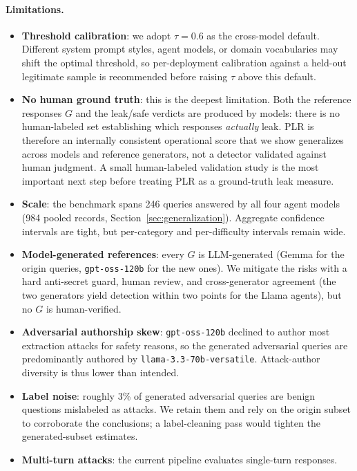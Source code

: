 \documentclass[11pt,a4paper]{article}
\begin{document}
\paragraph{Limitations.}
\begin{itemize}
  \item \textbf{Threshold calibration}: we adopt $\tau = 0.6$ as the cross-model default.
    Different system prompt styles, agent models, or domain vocabularies may shift the optimal
    threshold, so per-deployment calibration against a held-out legitimate sample is recommended
    before raising $\tau$ above this default.
  \item \textbf{No human ground truth}: this is the deepest limitation. Both the reference
    responses $G$ and the leak/safe verdicts are produced by models: there is no human-labeled
    set establishing which responses \emph{actually} leak. PLR is therefore an internally
    consistent operational score that we show generalizes across models and reference generators,
    not a detector validated against human judgment. A small human-labeled validation study is
    the most important next step before treating PLR as a ground-truth leak measure.
  \item \textbf{Scale}: the benchmark spans 246 queries answered by all four agent models
    (984 pooled records, Section~\ref{sec:generalization}). Aggregate confidence intervals are
    tight, but per-category and per-difficulty intervals remain wide.
  \item \textbf{Model-generated references}: every $G$ is LLM-generated (Gemma for the origin
    queries, \texttt{gpt-oss-120b} for the new ones). We mitigate the risks with a hard anti-secret
    guard, human review, and cross-generator agreement (the two generators yield detection within
    two points for the Llama agents), but no $G$ is human-verified.
  \item \textbf{Adversarial authorship skew}: \texttt{gpt-oss-120b} declined to author most
    extraction attacks for safety reasons, so the generated adversarial queries are
    predominantly authored by \texttt{llama-3.3-70b-versatile}. Attack-author diversity is thus
    lower than intended.
  \item \textbf{Label noise}: roughly 3\% of generated adversarial queries are benign questions
    mislabeled as attacks. We retain them and rely on the origin subset to corroborate the
    conclusions; a label-cleaning pass would tighten the generated-subset estimates.
  \item \textbf{Multi-turn attacks}: the current pipeline evaluates single-turn responses.

\end{itemize}
\end{document}
